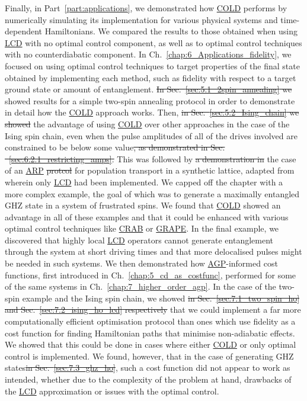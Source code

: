 \documentclass[a4paper,oneside,11pt]{book}
\newcommand{\acrref}[1]{\hyperref[acr:#1]{#1}}
\providecommand{\DIFaddtex}[1]{{\protect\color{blue}\uwave{#1}}} %
\providecommand{\DIFdeltex}[1]{{\protect\color{red}\sout{#1}}}                      %
\providecommand{\DIFaddbegin}{} %
\providecommand{\DIFaddend}{} %
\providecommand{\DIFdelbegin}{} %
\providecommand{\DIFdelend}{} %
\providecommand{\DIFadd}[1]{\texorpdfstring{\DIFaddtex{#1}}{#1}} %
\providecommand{\DIFdel}[1]{\texorpdfstring{\DIFdeltex{#1}}{}} %
\newcommand{\DIFscaledelfig}{0.5}
\newlength{\DIFdelgraphicswidth} %
\newlength{\DIFdelgraphicsheight} %
\newcommand{\DIFaddincludegraphics}[2][]{{\color{blue}\fbox{\DIFOincludegraphics[#1]{#2}}}} %
\newcommand{\DIFdelincludegraphics}[2][]{%
\sbox{\DIFdelgraphicsbox}{\DIFOincludegraphics[#1]{#2}}%
\settoboxwidth{\DIFdelgraphicswidth}{\DIFdelgraphicsbox} %
\settoboxtotalheight{\DIFdelgraphicsheight}{\DIFdelgraphicsbox} %
\scalebox{\DIFscaledelfig}{%
\parbox[b]{\DIFdelgraphicswidth}{\usebox{\DIFdelgraphicsbox}\\[-\baselineskip] \rule{\DIFdelgraphicswidth}{0em}}\llap{\resizebox{\DIFdelgraphicswidth}{\DIFdelgraphicsheight}{%
\setlength{\unitlength}{\DIFdelgraphicswidth}%
\begin{picture}(1,1)%
\thicklines\linethickness{2pt} %
{\color[rgb]{1,0,0}\put(0,0){\framebox(1,1){}}}%
{\color[rgb]{1,0,0}\put(0,0){\line( 1,1){1}}}%
{\color[rgb]{1,0,0}\put(0,1){\line(1,-1){1}}}%
\end{picture}%
}\hspace*{3pt}}} %
} %
\DeclareRobustCommand{\DIFaddbegin}{\DIFOaddbegin \let\includegraphics\DIFaddincludegraphics} %
\DeclareRobustCommand{\DIFaddend}{\DIFOaddend \let\includegraphics\DIFOincludegraphics} %
\DeclareRobustCommand{\DIFdelbegin}{\DIFOdelbegin \let\includegraphics\DIFdelincludegraphics} %
\DeclareRobustCommand{\DIFdelend}{\DIFOaddend \let\includegraphics\DIFOincludegraphics} %
\begin{document}
Finally, in Part~\ref{part:applications}, we demonstrated how \acrref{COLD} performs by numerically simulating its implementation for various physical systems and time-dependent Hamiltonians. We compared the results to those obtained when using \acrref{LCD} with no optimal control component, as well as to optimal control techniques with no counterdiabatic component. In Ch.~\ref{chap:6_Applications_fidelity}, we focused on using optimal control techniques to target properties of the final state obtained by implementing each method, such as fidelity with respect to a target ground state or amount of entanglement. \DIFdelbegin \DIFdel{In Sec.~\ref{sec:5.1_2spin_annealing} we }\DIFdelend \DIFaddbegin \DIFadd{We }\DIFaddend showed results for a simple two-spin annealing protocol in order to demonstrate in detail how the \acrref{COLD} approach works. Then, \DIFdelbegin \DIFdel{in Sec.~\ref{sec:5.2_Ising_chain} we showed }\DIFdelend \DIFaddbegin \DIFadd{we demonstrated }\DIFaddend the advantage of using \acrref{COLD} over other approaches in the case of the Ising spin chain, even when the pulse amplitudes of all of the drives involved are constrained to be below some value\DIFdelbegin \DIFdel{, as demonstrated in Sec. ~\ref{sec:6.2.1_restricting_amps}. }\DIFdelend \DIFaddbegin \DIFadd{. }\DIFaddend This was followed by \DIFdelbegin \DIFdel{a demonstration in }\DIFdelend the case of an \acrref{ARP} \DIFdelbegin \DIFdel{protcol }\DIFdelend \DIFaddbegin \DIFadd{protocol }\DIFaddend for population transport in a synthetic lattice, adapted from \cite{meier_counterdiabatic_2020} wherein only \acrref{LCD} had been implemented. We capped off the chapter with a more complex example, the goal of which was to generate a maximally entangled GHZ state in a system of frustrated spins. We found that \acrref{COLD} showed an advantage in all of these examples and that it could be enhanced with various optimal control techniques like \acrref{CRAB} or \acrref{GRAPE}. In the final example, we discovered that highly local \acrref{LCD} operators cannot generate entanglement through the system at short driving times and that more delocalised pulses might be needed in such systems. We then demonstrated how \acrref{AGP}-informed cost functions, first introduced in Ch.~\ref{chap:5_cd_as_costfunc}, performed for some of the same systems in Ch.~\ref{chap:7_higher_order_agp}. In the case of the two-spin example and the Ising spin chain, we showed \DIFdelbegin \DIFdel{in Sec.~\ref{sec:7.1_two_spin_ho} and Sec.~\ref{sec:7.2_ising_ho_lcd} respectively }\DIFdelend that we could implement a far more computationally efficient optimisation protocol than ones which use fidelity as a cost function for finding Hamiltonian paths that minimise non-adiabatic effects. We showed that this could be done in cases where either \acrref{COLD} or only optimal control is implemented. We found, however, that in the case of generating GHZ states\DIFdelbegin \DIFdel{in Sec.~\ref{sec:7.3_ghz_ho}}\DIFdelend , such a cost function did not appear to work as intended, whether due to the complexity of the problem at hand, drawbacks of the \acrref{LCD} approximation or issues with the optimal control. 
\end{document}
